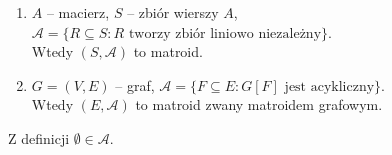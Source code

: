 \begin{example} \label{ex:matroid-podstawowe} \leavevmode
	\begin{enumerate}[ref=\thedefinition.\arabic*]
		\item \label{ex:matroid:wektorowy} $A$ -- macierz, $S$ -- zbiór wierszy $A$, $\mathcal{A} = \{R \subseteq S : R \text{ tworzy zbiór liniowo niezależny}\}$.\\
		      Wtedy $(S, \mathcal{A})$ to matroid.
		\item \label{ex:matroid:grafowy} $G = (V, E)$ -- graf, $\mathcal{A} = \{F \subseteq E : G[F] \text{ jest acykliczny}\}$.\\
		      Wtedy $(E, \mathcal{A})$ to matroid zwany matroidem grafowym.
	\end{enumerate}
	Z definicji $\emptyset \in \mathcal{A}$.
\end{example}

